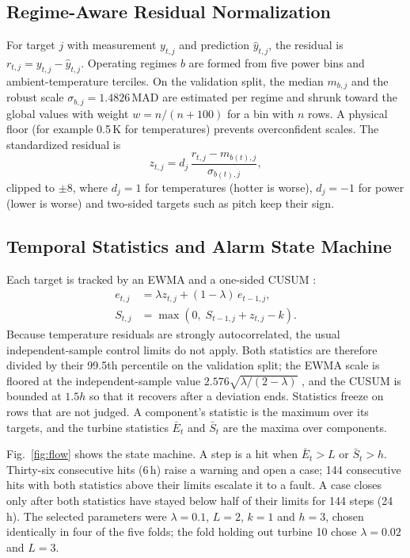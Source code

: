 \documentclass[conference]{IEEEtran}
\begin{document}
\subsection{Regime-Aware Residual Normalization}
For target $j$ with measurement $y_{t,j}$ and prediction $\hat{y}_{t,j}$, the residual is $r_{t,j}=y_{t,j}-\hat{y}_{t,j}$. Operating regimes $b$ are formed from five power bins and ambient-temperature terciles. On the validation split, the median $m_{b,j}$ and the robust scale $\sigma_{b,j}=1.4826\,\mathrm{MAD}$ \cite{rousseeuw1993mad} are estimated per regime and shrunk toward the global values with weight $w=n/(n+100)$ for a bin with $n$ rows. A physical floor (for example 0.5\,K for temperatures) prevents overconfident scales. The standardized residual is
\begin{equation}
z_{t,j}=d_j\,\frac{r_{t,j}-m_{b(t),j}}{\sigma_{b(t),j}},\label{eq:z}
\end{equation}
clipped to $\pm 8$, where $d_j=1$ for temperatures (hotter is worse), $d_j=-1$ for power (lower is worse) and two-sided targets such as pitch keep their sign.

\subsection{Temporal Statistics and Alarm State Machine}
Each target is tracked by an EWMA and a one-sided CUSUM \cite{roberts1959ewma,page1954cusum}:
\begin{align}
e_{t,j}&=\lambda z_{t,j}+(1-\lambda)\,e_{t-1,j},\label{eq:ewma}\\
S_{t,j}&=\max\!\left(0,\;S_{t-1,j}+z_{t,j}-k\right).\label{eq:cusum}
\end{align}
Because temperature residuals are strongly autocorrelated, the usual independent-sample control limits do not apply. Both statistics are therefore divided by their 99.5th percentile on the validation split; the EWMA scale is floored at the independent-sample value $2.576\sqrt{\lambda/(2-\lambda)}$ \cite{lucas1990ewma}, and the CUSUM is bounded at $1.5h$ so that it recovers after a deviation ends. Statistics freeze on rows that are not judged. A component's statistic is the maximum over its targets, and the turbine statistics $\bar{E}_t$ and $\bar{S}_t$ are the maxima over components.

Fig.~\ref{fig:flow} shows the state machine. A step is a hit when $\bar{E}_t>L$ or $\bar{S}_t>h$. Thirty-six consecutive hits (6\,h) raise a warning and open a case; 144 consecutive hits with both statistics above their limits escalate it to a fault. A case closes only after both statistics have stayed below half of their limits for 144 steps (24\,h). The selected parameters were $\lambda=0.1$, $L=2$, $k=1$ and $h=3$, chosen identically in four of the five folds; the fold holding out turbine 10 chose $\lambda=0.02$ and $L=3$.
\end{document}
